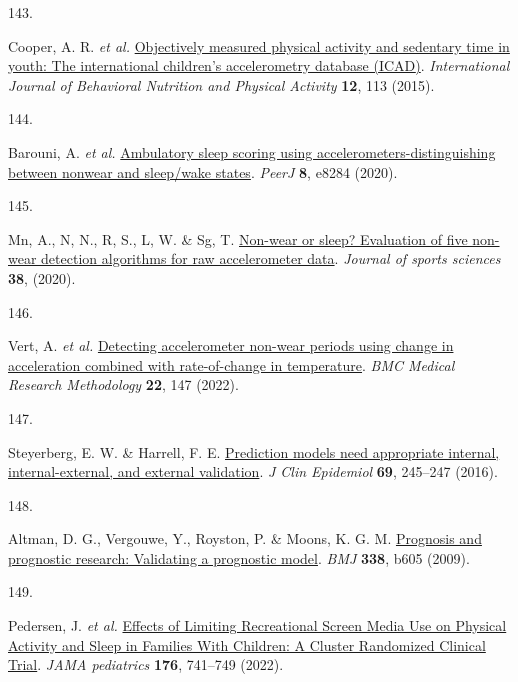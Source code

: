 \documentclass[
  10pt,
]{scrbook}
\newlength{\cslhangindent}
\newlength{\csllabelwidth}
\newlength{\cslentryspacingunit} %
\newenvironment{CSLReferences}[2] %
 {%
  \setlength{\parindent}{0pt}
  \ifodd #1
  \let\oldpar\par
  \def\par{\hangindent=\cslhangindent\oldpar}
  \fi
  \setlength{\parskip}{#2\cslentryspacingunit}
 }%
 {}
\newcommand{\CSLLeftMargin}[1]{\parbox[t]{\csllabelwidth}{#1}}
\newcommand{\CSLRightInline}[1]{\parbox[t]{\linewidth - \csllabelwidth}{#1}\break}
\let\originaltextbf\textbf
\renewcommand{\textbf}[1]{\textcolor{color1}{\textsf{\originaltextbf{#1}}}}
\begin{document}
\begin{CSLReferences}{0}{0}
\leavevmode{}%
\CSLLeftMargin{143. }%
\CSLRightInline{Cooper, A. R. \emph{et al.}
\href{https://doi.org/10.1186/s12966-015-0274-5}{Objectively measured
physical activity and sedentary time in youth: The international
children's accelerometry database ({ICAD})}. \emph{International Journal
of Behavioral Nutrition and Physical Activity} \textbf{12}, 113 (2015).}

\leavevmode{}%
\CSLLeftMargin{144. }%
\CSLRightInline{Barouni, A. \emph{et al.}
\href{https://doi.org/10.7717/peerj.8284}{Ambulatory sleep scoring using
accelerometers-distinguishing between nonwear and sleep/wake states}.
\emph{{PeerJ}} \textbf{8}, e8284 (2020).}

\leavevmode{}%
\CSLLeftMargin{145. }%
\CSLRightInline{Mn, A., N, N., R, S., L, W. \& Sg, T.
\href{https://doi.org/10.1080/02640414.2019.1703301}{Non-wear or sleep?
Evaluation of five non-wear detection algorithms for raw accelerometer
data}. \emph{Journal of sports sciences} \textbf{38}, (2020).}

\leavevmode{}%
\CSLLeftMargin{146. }%
\CSLRightInline{Vert, A. \emph{et al.}
\href{https://doi.org/10.1186/s12874-022-01633-6}{Detecting
accelerometer non-wear periods using change in acceleration combined
with rate-of-change in temperature}. \emph{{BMC} Medical Research
Methodology} \textbf{22}, 147 (2022).}

\leavevmode{}%
\CSLLeftMargin{147. }%
\CSLRightInline{Steyerberg, E. W. \& Harrell, F. E.
\href{https://doi.org/10.1016/j.jclinepi.2015.04.005}{Prediction models
need appropriate internal, internal-external, and external validation}.
\emph{J Clin Epidemiol} \textbf{69}, 245--247 (2016).}

\leavevmode{}%
\CSLLeftMargin{148. }%
\CSLRightInline{Altman, D. G., Vergouwe, Y., Royston, P. \& Moons, K. G.
M. \href{https://doi.org/10.1136/bmj.b605}{Prognosis and prognostic
research: Validating a prognostic model}. \emph{{BMJ}} \textbf{338},
b605 (2009).}

\leavevmode{}%
\CSLLeftMargin{149. }%
\CSLRightInline{Pedersen, J. \emph{et al.}
\href{https://doi.org/10.1001/jamapediatrics.2022.1519}{Effects of
Limiting Recreational Screen Media Use on Physical Activity and Sleep in
Families With Children: A Cluster Randomized Clinical Trial}. \emph{JAMA
pediatrics} \textbf{176}, 741--749 (2022).}


\end{CSLReferences}
\end{document}
